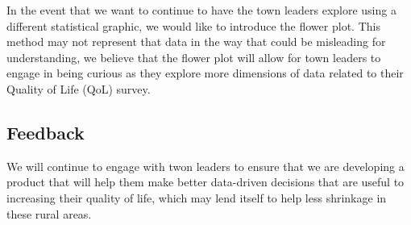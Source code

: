 \documentclass[letterpaper,inpress]{jdsart}
\begin{document}
In the event that we want to continue to have the town leaders explore using a different statistical graphic, we would like to introduce the flower plot. This method may not represent that data in the way that could be misleading for understanding, we believe that the flower plot will allow for town leaders to engage in being curious as they explore more dimensions of data related to their Quality of Life (QoL) survey.

\subsection{Feedback}

We will continue to engage with twon leaders to ensure that we are developing a product that will help them make better data-driven decisions that are useful to increasing their quality of life, which may lend itself to help less shrinkage in these rural areas.



\end{document}
